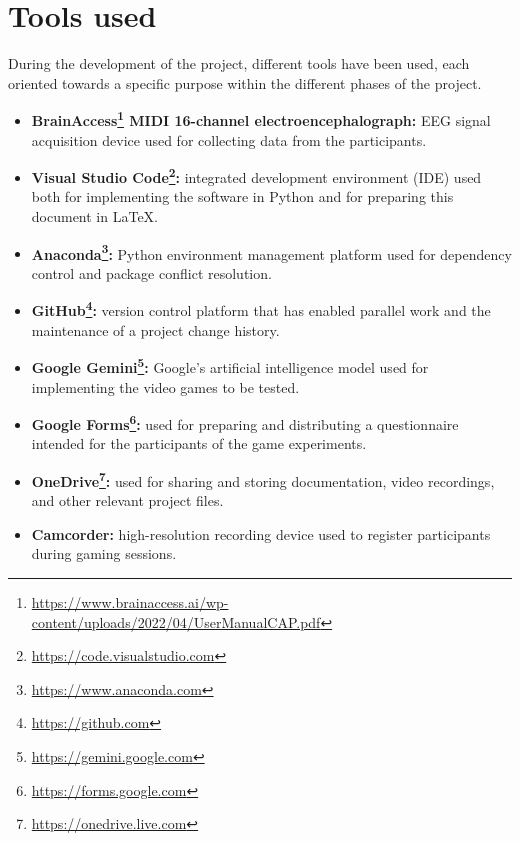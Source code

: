 \section*{Tools used}
During the development of the project, different tools have been used, each
oriented towards a specific purpose within the different phases of the project.

\begin{itemize}
    \item \textbf{BrainAccess\footnote{\url{https://www.brainaccess.ai/wp-content/uploads/2022/04/UserManualCAP.pdf}} MIDI 16-channel electroencephalograph:} EEG signal acquisition device used for collecting data from the participants.

    \item \textbf{Visual Studio Code\footnote{\url{https://code.visualstudio.com}}:} integrated development environment (IDE) used both for implementing the software in Python and for preparing this document in \LaTeX.
    
    \item \textbf{Anaconda\footnote{\url{https://www.anaconda.com}}:} Python environment management platform used for dependency control and package conflict resolution.

    \item \textbf{GitHub\footnote{\url{https://github.com}}:} version control platform that has enabled parallel work and the maintenance of a project change history.
    
    \item \textbf{Google Gemini\footnote{\url{https://gemini.google.com}}:} Google's artificial intelligence model used for implementing the video games to be tested.

    \item \textbf{Google Forms\footnote{\url{https://forms.google.com}}:} used for preparing and distributing a questionnaire intended for the participants of the game experiments.
    
    \item \textbf{OneDrive\footnote{\url{https://onedrive.live.com}}:} used for sharing and storing documentation, video recordings, and other relevant project files.
    
    \item \textbf{Camcorder:} high-resolution recording device used to register participants during gaming sessions.
\end{itemize}

